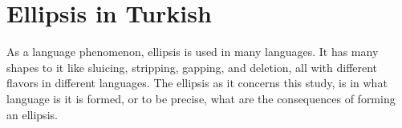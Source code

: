 \section{Ellipsis in Turkish}

As a language phenomenon, ellipsis is used in many languages. It has many shapes to it like sluicing, stripping, gapping, and deletion, all with different flavors in different languages. The ellipsis as it concerns this study, is in what language is it is formed, or to be precise, what are the consequences of forming an ellipsis. 
